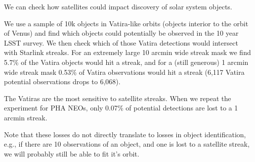 We can check how satellites could impact discovery of solar system objects. 

We use a sample of 10k objects in Vatira-like orbits (objects interior to the orbit of Venus) and find which objects could potentially be observed in the 10 year LSST survey. We then check which of those Vatira detections would intersect with Starlink streaks. For an extremely large 10 arcmin wide streak mask we find 5.7\% of the Vatira objects would hit a streak, and for a (still generous) 1 arcmin wide streak mask 0.53\% of Vatira observations would hit a streak (6,117 Vatira potential observations drops to 6,068). 

The Vatiras are the most sensitive to satellite streaks. When we repeat the experiment for PHA NEOs, only 0.07\% of potential detections are lost to a 1 arcmin streak. 

Note that these losses do not directly translate to losses in object identification, e.g., if there are 10 observations of an object, and one is lost to a satellite streak, we will probably still be able to fit it's orbit. 



